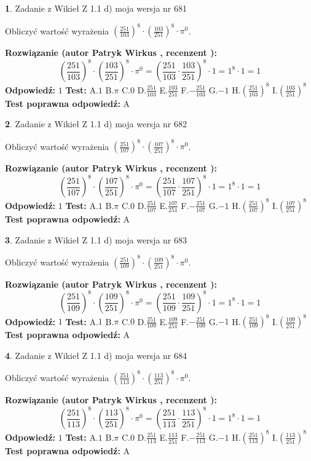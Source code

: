 \documentclass[12pt, a4paper]{article}
\theoremstyle{definition} %
\newtheorem{zad}{}
\newcommand{\zadStart}[1]{\begin{zad}#1\newline}
\newcommand{\zadStop}{\end{zad}}
\newcommand{\rozwStart}[2]{\noindent \textbf{Rozwiązanie (autor #1 , recenzent #2): }\newline}
\newcommand{\rozwStop}{\newline}
\newcommand{\odpStart}{\noindent \textbf{Odpowiedź:}\newline}
\newcommand{\odpStop}{\newline}
\newcommand{\testStart}{\noindent \textbf{Test:}\newline}
\newcommand{\testStop}{\newline}
\newcommand{\kluczStart}{\noindent \textbf{Test poprawna odpowiedź:}\newline}
\newcommand{\kluczStop}{\newline}
\begin{document}
\zadStart{Zadanie z Wikieł Z 1.1 d) moja wersja nr 681}

Obliczyć wartość wyrażenia $(\frac{251}{103})^{8} \cdot (\frac{103}{251})^{8} \cdot \pi^{0}$.
\zadStop
\rozwStart{Patryk Wirkus}{}
$$(\frac{251}{103})^{8} \cdot (\frac{103}{251})^{8} \cdot \pi^{0} = (\frac{251}{103} \cdot \frac{103}{251})^{8} \cdot 1 = 1^{8} \cdot 1 = 1$$
\rozwStop
\odpStart
$1$
\odpStop
\testStart
A.$1$ B.$\pi$ C.$0$ D.$\frac{251}{103}$ E.$\frac{103}{251}$
F.$-\frac{251}{103}$ G.$-1$
H.$(\frac{251}{103})^{8}$
I.$(\frac{103}{251})^{8}$
\testStop
\kluczStart
A
\kluczStop



\zadStart{Zadanie z Wikieł Z 1.1 d) moja wersja nr 682}

Obliczyć wartość wyrażenia $(\frac{251}{107})^{8} \cdot (\frac{107}{251})^{8} \cdot \pi^{0}$.
\zadStop
\rozwStart{Patryk Wirkus}{}
$$(\frac{251}{107})^{8} \cdot (\frac{107}{251})^{8} \cdot \pi^{0} = (\frac{251}{107} \cdot \frac{107}{251})^{8} \cdot 1 = 1^{8} \cdot 1 = 1$$
\rozwStop
\odpStart
$1$
\odpStop
\testStart
A.$1$ B.$\pi$ C.$0$ D.$\frac{251}{107}$ E.$\frac{107}{251}$
F.$-\frac{251}{107}$ G.$-1$
H.$(\frac{251}{107})^{8}$
I.$(\frac{107}{251})^{8}$
\testStop
\kluczStart
A
\kluczStop



\zadStart{Zadanie z Wikieł Z 1.1 d) moja wersja nr 683}

Obliczyć wartość wyrażenia $(\frac{251}{109})^{8} \cdot (\frac{109}{251})^{8} \cdot \pi^{0}$.
\zadStop
\rozwStart{Patryk Wirkus}{}
$$(\frac{251}{109})^{8} \cdot (\frac{109}{251})^{8} \cdot \pi^{0} = (\frac{251}{109} \cdot \frac{109}{251})^{8} \cdot 1 = 1^{8} \cdot 1 = 1$$
\rozwStop
\odpStart
$1$
\odpStop
\testStart
A.$1$ B.$\pi$ C.$0$ D.$\frac{251}{109}$ E.$\frac{109}{251}$
F.$-\frac{251}{109}$ G.$-1$
H.$(\frac{251}{109})^{8}$
I.$(\frac{109}{251})^{8}$
\testStop
\kluczStart
A
\kluczStop



\zadStart{Zadanie z Wikieł Z 1.1 d) moja wersja nr 684}

Obliczyć wartość wyrażenia $(\frac{251}{113})^{8} \cdot (\frac{113}{251})^{8} \cdot \pi^{0}$.
\zadStop
\rozwStart{Patryk Wirkus}{}
$$(\frac{251}{113})^{8} \cdot (\frac{113}{251})^{8} \cdot \pi^{0} = (\frac{251}{113} \cdot \frac{113}{251})^{8} \cdot 1 = 1^{8} \cdot 1 = 1$$
\rozwStop
\odpStart
$1$
\odpStop
\testStart
A.$1$ B.$\pi$ C.$0$ D.$\frac{251}{113}$ E.$\frac{113}{251}$
F.$-\frac{251}{113}$ G.$-1$
H.$(\frac{251}{113})^{8}$
I.$(\frac{113}{251})^{8}$
\testStop
\kluczStart
A
\kluczStop
\end{document}
